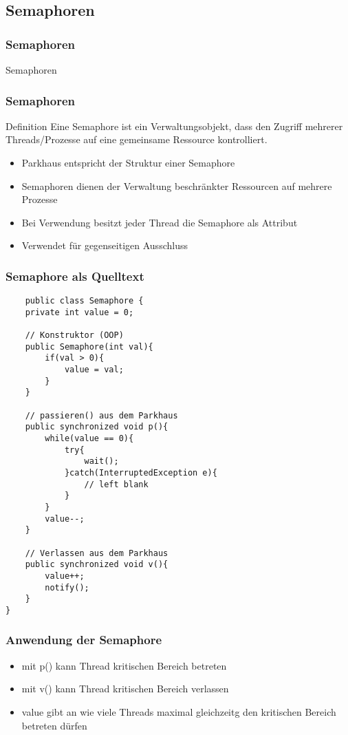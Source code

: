 \subsection{Semaphoren}
\begin{frame}[fragile]
	\frametitle{Semaphoren}
	\huge Semaphoren
\end{frame}

\begin{frame}[fragile]
	\frametitle{Semaphoren}
	\begin{exampleblock}{Definition}
	Eine Semaphore ist ein Verwaltungsobjekt, dass den Zugriff mehrerer
	Threads/Prozesse auf eine gemeinsame Ressource kontrolliert.
	\end{exampleblock}
	\begin{itemize}
	  \item Parkhaus entspricht der Struktur einer Semaphore
	  \item Semaphoren dienen der Verwaltung beschränkter Ressourcen auf mehrere
	  Prozesse
	  \item Bei Verwendung besitzt jeder Thread die Semaphore als Attribut
	  \item Verwendet für gegenseitigen Ausschluss
	\end{itemize}
\end{frame}

\begin{frame}[fragile]
	\frametitle{Semaphore als Quelltext}
	\begin{lstlisting}
	public class Semaphore {
	private int value = 0;
	
	// Konstruktor (OOP)
	public Semaphore(int val){
		if(val > 0){
			value = val;
		}
	}
	
	// passieren() aus dem Parkhaus
	public synchronized void p(){
		while(value == 0){
			try{
				wait();
			}catch(InterruptedException e){
				// left blank
			}
		}
		value--;
	}
	
	// Verlassen aus dem Parkhaus
	public synchronized void v(){
		value++;
		notify();
	}
}
	\end{lstlisting}
\end{frame}

\begin{frame}[fragile]
	\frametitle{Anwendung der Semaphore}
	\begin{itemize}
	  \item mit p() kann Thread kritischen Bereich betreten
	  \item mit v() kann Thread kritischen Bereich verlassen
	  \item value gibt an wie viele Threads maximal gleichzeitg den kritischen
	  Bereich betreten dürfen
	\end{itemize}
\end{frame}

